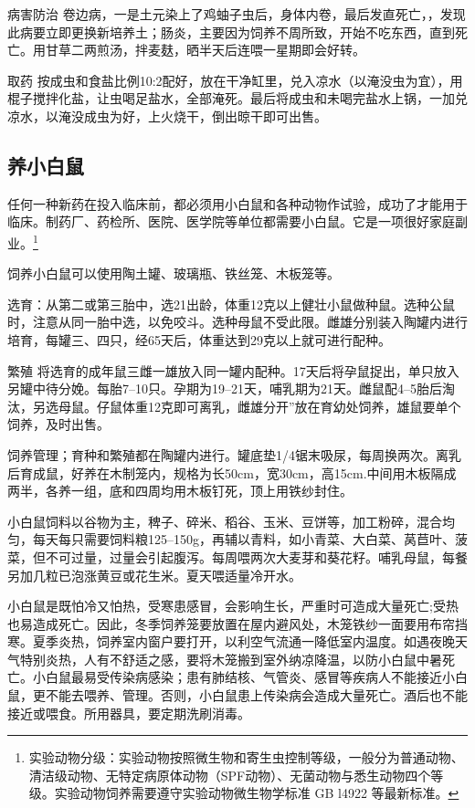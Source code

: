 \documentclass{ctexbook}
\begin{document}
病害防治 卷边病，一是土元染上了鸡蚰子虫后，身体内卷，最后发直死亡，，发现此病要立即更换新培养土；肠炎，主要因为饲养不周所致，开始不吃东西，直到死亡。用甘草二两煎汤，拌麦麸，晒半天后连喂一星期即会好转。

取药 按成虫和食盐比例10:2配好，放在干净缸里，兑入凉水（以淹没虫为宜），用棍子搅拌化盐，让虫喝足盐水，全部淹死。最后将成虫和未喝完盐水上锅，一加兑凉水，以淹没成虫为好，上火烧干，倒出晾干即可出售。
\subsection{养小白鼠}
任何一种新药在投入临床前，都必须用小白鼠和各种动物作试验，成功了才能用于临床。制药厂、药检所、医院、医学院等单位都需要小白鼠。它是一项很好家庭副业。\footnote{实验动物分级：实验动物按照微生物和寄生虫控制等级，一般分为普通动物、清洁级动物、无特定病原体动物（SPF动物）、无菌动物与悉生动物四个等级。实验动物饲养需要遵守实验动物微生物学标准 GB l4922 等最新标准。}

饲养小白鼠可以使用陶土罐、玻璃瓶、铁丝笼、木板笼等。

选育：从第二或第三胎中，选21出龄，体重12克以上健壮小鼠做种鼠。选种公鼠时，注意从同一胎中选，以免咬斗。选种母鼠不受此限。雌雄分别装入陶罐内进行培育，每罐三、四只，经65天后，体重达到29克以上就可进行配种。

繁殖 将选育的成年鼠三雌一雄放入同一罐内配种。17天后将孕鼠捉出，单只放入另罐中待分娩。每胎7--10只。孕期为19--21天，哺乳期为21天。雌鼠配4--5胎后淘汰，另选母鼠。仔鼠体重12克即可离乳，雌雄分开”放在育幼处饲养，雄鼠要单个饲养，及时出售。

饲养管理；育种和繁殖都在陶罐内进行。罐底垫1/4锯末吸尿，每周换两次。离乳后育成鼠，好养在木制笼内，规格为长50cm，宽30cm，高15cm.中间用木板隔成两半，各养一组，底和四周均用木板钉死，顶上用铁纱封住。

小白鼠饲料以谷物为主，稗子、碎米、稻谷、玉米、豆饼等，加工粉碎，混合均匀，每天每只需要饲料粮125--150g，再辅以青料，如小青菜、大白菜、莴苣叶、菠菜，但不可过量，过量会引起腹泻。每周喂两次大麦芽和葵花籽。哺乳母鼠，每餐另加几粒已泡涨黄豆或花生米。夏天喂适量冷开水。

小白鼠是既怕冷又怕热，受寒患感冒，会影响生长，严重时可造成大量死亡;受热也易造成死亡。因此，冬季饲养笼要放置在屋内避风处，木笼铁纱一面要用布帘挡寒。夏季炎热，饲养室内窗户要打开，以利空气流通一降低室内温度。如遇夜晚天气特别炎热，人有不舒适之感，要将木笼搬到室外纳凉降温，以防小白鼠中暑死亡。小白鼠最易受传染病感染；患有肺结核、气管炎、感冒等疾病人不能接近小白鼠，更不能去喂养、管理。否则，小白鼠患上传染病会造成大量死亡。酒后也不能接近或喂食。所用器具，要定期洗刷消毒。
\end{document}
